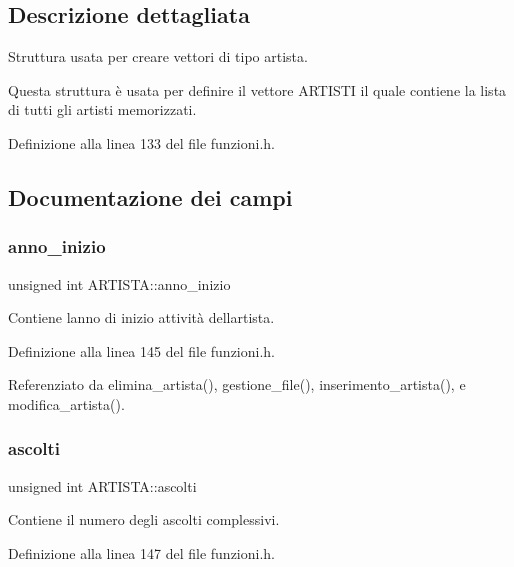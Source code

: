 \subsection{Descrizione dettagliata}
Struttura usata per creare vettori di tipo artista. 

Questa struttura è usata per definire il vettore A\+R\+T\+I\+S\+TI il quale contiene la lista di tutti gli artisti memorizzati. 

Definizione alla linea 133 del file funzioni.\+h.



\subsection{Documentazione dei campi}
\mbox{\label{struct_a_r_t_i_s_t_a_a776bd83463cbbd70affcbc08b7687675}} 
\subsubsection{\texorpdfstring{anno\+\_\+inizio}{anno\_inizio}}
{\footnotesize\ttfamily unsigned int A\+R\+T\+I\+S\+T\+A\+::anno\+\_\+inizio}

Contiene l\textquotesingle{}anno di inizio attività dell\textquotesingle{}artista. 

Definizione alla linea 145 del file funzioni.\+h.



Referenziato da elimina\+\_\+artista(), gestione\+\_\+file(), inserimento\+\_\+artista(), e modifica\+\_\+artista().

\mbox{\label{struct_a_r_t_i_s_t_a_a94634853ac282b23729897e105865590}} 
\subsubsection{\texorpdfstring{ascolti}{ascolti}}
{\footnotesize\ttfamily unsigned int A\+R\+T\+I\+S\+T\+A\+::ascolti}

Contiene il numero degli ascolti complessivi. 

Definizione alla linea 147 del file funzioni.\+h.



